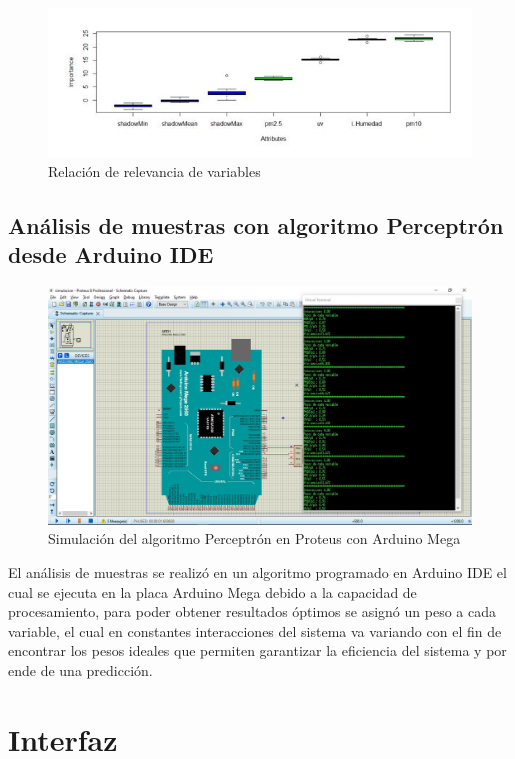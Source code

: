\documentclass[10pt,a4paper]{article}
\begin{document}
\begin{figure}[H]
\centering
 \includegraphics[scale=1]{importancia.JPG} 
\caption{Relación de relevancia de variables} 
\end{figure}
\subsection{Análisis de muestras con algoritmo Perceptrón desde Arduino IDE}

\begin{figure}[H]
\centering
 \includegraphics[scale=0.45]{simulacion.JPG} 
\caption{Simulación del algoritmo Perceptrón en Proteus con Arduino Mega} 
\end{figure}

El análisis de muestras se realizó en un algoritmo programado en Arduino IDE el cual se ejecuta en la placa Arduino Mega debido a la capacidad de procesamiento, para poder obtener resultados óptimos se asignó un peso a cada variable, el cual en constantes interacciones del sistema va variando con el fin de encontrar los pesos ideales que permiten garantizar la eficiencia del sistema y por ende de una predicción.

\section{Interfaz}
\end{document}
